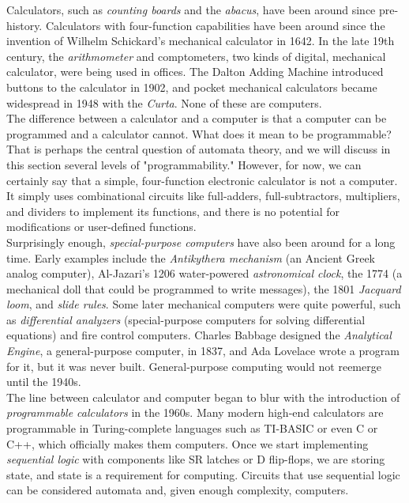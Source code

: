 Calculators, such as \textit{counting boards} and the \textit{abacus}, have been around since pre-history. Calculators with four-function capabilities have been around since the invention of Wilhelm Schickard's mechanical calculator in 1642. In the late 19th century, the \textit{arithmometer} and comptometers, two kinds of digital, mechanical calculator, were being used in offices. The Dalton Adding Machine introduced buttons to the calculator in 1902, and pocket mechanical calculators became widespread in 1948 with the \textit{Curta}. None of these are computers. \\

The difference between a calculator and a computer is that a computer can be programmed and a calculator cannot. What does it mean to be programmable? That is perhaps the central question of automata theory, and we will discuss in this section several levels of "programmability." However, for now, we can certainly say that a simple, four-function electronic calculator is not a computer. It simply uses combinational circuits like full-adders, full-subtractors, multipliers, and dividers to implement its functions, and there is no potential for modifications or user-defined functions. \\

Surprisingly enough, \textit{special-purpose computers} have also been around for a long time. Early examples include the \textit{Antikythera mechanism} (an Ancient Greek analog computer), Al-Jazari's 1206 water-powered \textit{astronomical clock}, the 1774  (a mechanical doll that could be programmed to write messages), the 1801 \textit{Jacquard loom}, and \textit{slide rules}. Some later mechanical computers were quite powerful, such as \textit{differential analyzers} (special-purpose computers for solving differential equations) and fire control computers. Charles Babbage designed the \textit{Analytical Engine}, a general-purpose computer, in 1837, and Ada Lovelace wrote a program for it, but it was never built. General-purpose computing would not reemerge until the 1940s. \\

The line between calculator and computer began to blur with the introduction of \textit{programmable calculators} in the 1960s. Many modern high-end calculators are programmable in Turing-complete languages such as TI-BASIC or even C or C++, which officially makes them computers. Once we start implementing \textit{sequential logic} with components like SR latches or D flip-flops, we are storing state, and state is a requirement for computing. Circuits that use sequential logic can be considered automata and, given enough complexity, computers. \\\\

